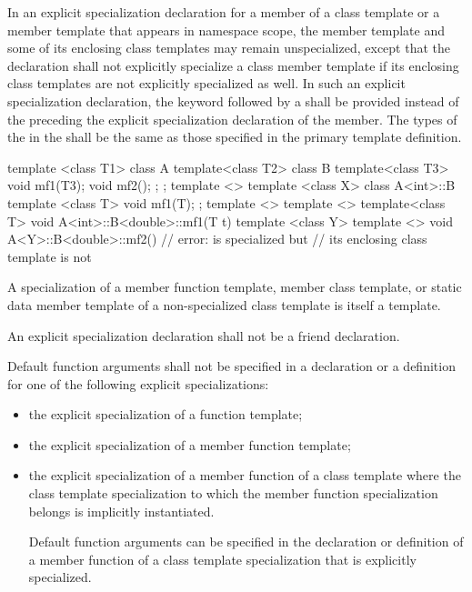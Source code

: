 \pnum
In an explicit specialization declaration for a member of a class template or
a member template that appears in namespace scope,
the member template and some of its enclosing class templates may remain
unspecialized,
except that the declaration shall not explicitly specialize a class member
template if its enclosing class templates are not explicitly specialized
as well.
In such an explicit specialization declaration, the keyword
followed by a
shall be provided instead of the
preceding the explicit specialization declaration of the member.
The types of the
in the
shall be the same as those specified in the primary template definition.
\begin{example}
\begin{codeblock}
template <class T1> class A {
  template<class T2> class B {
    template<class T3> void mf1(T3);
    void mf2();
  };
};
template <> template <class X>
  class A<int>::B {
      template <class T> void mf1(T);
  };
template <> template <> template<class T>
  void A<int>::B<double>::mf1(T t) { }
template <class Y> template <>
  void A<Y>::B<double>::mf2() { }       // error:  is specialized but
                                        // its enclosing class template  is not
\end{codeblock}
\end{example}

\pnum
A specialization of a member function template, member class template,
or static data member template of
a non-specialized class template is itself a template.

\pnum
An explicit specialization declaration shall not be a friend declaration.

\pnum
Default function arguments shall not be specified in a declaration or
a definition for one of the following explicit specializations:
\begin{itemize}
\item
the explicit specialization of a function template;
\item
the explicit specialization of a member function template;
\item
the explicit specialization of a member function of a class template where
the class template specialization to which the member function specialization
belongs is implicitly instantiated.
\begin{note}
Default function arguments can be specified in the declaration or
definition of a member function of a class template specialization that is
explicitly specialized.
\end{note}
\end{itemize}


